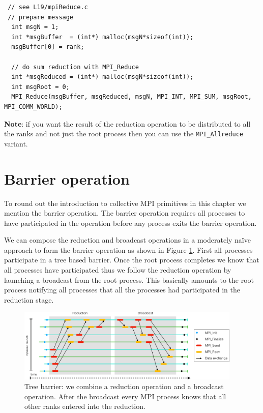 \begin{verbatim}
 // see L19/mpiReduce.c
 // prepare message                  
  int msgN = 1;
  int *msgBuffer  = (int*) malloc(msgN*sizeof(int));
  msgBuffer[0] = rank;

  // do sum reduction with MPI_Reduce  
  int *msgReduced = (int*) malloc(msgN*sizeof(int));
  int msgRoot = 0;
  MPI_Reduce(msgBuffer, msgReduced, msgN, MPI_INT, MPI_SUM, msgRoot, MPI_COMM_WORLD);
\end{verbatim}

{\bf Note}: if you want the result of the reduction operation to be distributed to all the ranks and not just the root process then you can use the \texttt{MPI\_Allreduce} variant.

\section{Barrier operation}

To round out the introduction to collective MPI primitives in this chapter we mention the barrier operation. The barrier operation requires all processes to have participated in the operation before any process exits the barrier operation. 

We can compose the reduction and broadcast operations in a moderately na\"{i}ve approach to form the barrier operation as shown in Figure \ref{barrier.fig}. First all processes participate in a tree based barrier. Once the root process completes we know that all processes have participated thus we follow the reduction operation by launching a broadcast from the root process. This basically amounts to the root process notifying all processes that all the processes had participated in the reduction stage. 
\begin{figure}[htbp!]
    \centering
    \includegraphics[width=0.95\textwidth]{figures/L19/CMDA3634FA19Barrier-crop.pdf}
    \caption{Tree barrier: we combine a reduction operation and a broadcast operation. After the broadcast every MPI process knows that all other ranks entered into the reduction. }
    \label{barrier.fig}
\end{figure}

